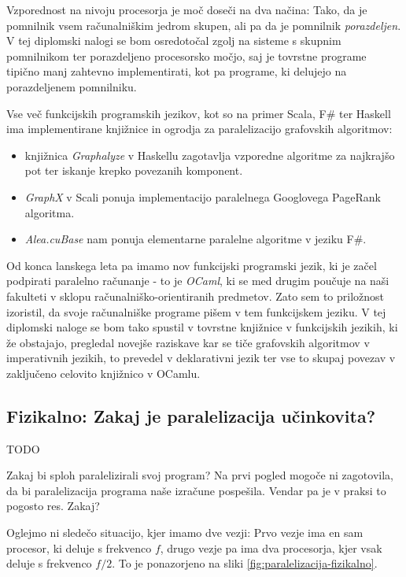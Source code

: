 \documentclass[mat1, tisk]{fmfdelo}
\begin{document}
Vzporednost na nivoju procesorja je moč doseči na dva načina: 
Tako, da je pomnilnik vsem računalniškim jedrom skupen, ali pa da je pomnilnik \textit{porazdeljen}. 
V tej diplomski nalogi se bom osredotočal zgolj na sisteme s skupnim pomnilnikom ter porazdeljeno procesorsko močjo, 
saj je tovrstne programe tipično manj zahtevno implementirati, kot pa programe, ki delujejo na porazdeljenem pomnilniku.

Vse več funkcijskih programskih jezikov, kot so na primer Scala, F\# ter Haskell ima implementirane knjižnice
in ogrodja za paralelizacijo grafovskih algoritmov:
\begin{itemize}
    \item knjižnica \textit{Graphalyze} v Haskellu zagotavlja vzporedne algoritme za najkrajšo pot 
    ter iskanje krepko povezanih komponent.
    \item \textit{GraphX} v Scali ponuja implementacijo paralelnega Googlovega PageRank algoritma.
    \item \textit{Alea.cuBase} nam ponuja elementarne paralelne algoritme v jeziku F\#.
\end{itemize}

Od konca lanskega leta pa imamo nov funkcijski programski jezik, ki je začel podpirati paralelno računanje - to je \textit{OCaml},
ki se med drugim poučuje na naši fakulteti v sklopu računalniško-orientiranih predmetov. 
Zato sem to priložnost izoristil, da svoje računalniške programe pišem v tem funkcijskem jeziku. 
V tej diplomski naloge se bom tako spustil v tovrstne knjižnice v funkcijskih jezikih, ki že obstajajo, 
pregledal novejše raziskave kar se tiče grafovskih algoritmov v imperativnih jezikih, 
to prevedel v deklarativni jezik ter vse to skupaj povezav v zaključeno celovito knjižnico v OCamlu.

\subsection{Fizikalno: Zakaj je paralelizacija učinkovita?}

TODO

Zakaj bi sploh paralelizirali svoj program? Na prvi pogled mogoče ni zagotovila, da bi paralelizacija programa 
naše izračune pospešila. Vendar pa je v praksi to pogosto res. Zakaj?

Oglejmo ni sledečo situacijo, kjer imamo dve vezji: Prvo vezje ima en sam procesor, ki deluje s frekvenco $f$, 
drugo vezje pa ima dva procesorja, kjer vsak deluje s frekvenco $f/2$.
To je ponazorjeno na sliki \ref{fig:paralelizacija-fizikalno}.
\end{document}
